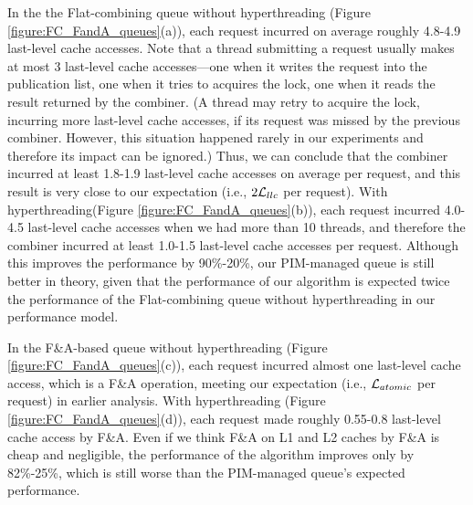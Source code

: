 In the the Flat-combining queue without hyperthreading (Figure \ref{figure:FC_FandA_queues}(a)), 
each request incurred on average roughly 4.8-4.9 last-level cache accesses. 
Note that a thread submitting a request usually makes at most 3 last-level cache accesses---one 
when it writes the request into the publication list, one when it tries to acquires the lock, 
one when it reads the result returned by the combiner. 
(A thread may retry to acquire the lock, incurring more last-level cache accesses, 
if its request was missed by the previous combiner. 
However, this situation happened rarely in our experiments and therefore its impact can be ignored.) 
Thus, we can conclude that the combiner incurred at least 1.8-1.9 last-level cache accesses 
on average per request, and this result is very close to our expectation (i.e., $2\mathcal{L}_{llc}$ per request). 
With hyperthreading(Figure \ref{figure:FC_FandA_queues}(b)), 
each request incurred 4.0-4.5 last-level cache accesses when we had more than 10 threads, 
and therefore the combiner incurred at least 1.0-1.5 last-level cache accesses per request. 
Although this improves the performance by 90\%-20\%, our PIM-managed queue is still better in theory, 
given that the performance of our algorithm is expected twice the performance of 
the Flat-combining queue without hyperthreading in our performance model. 

In the F\&A-based queue without hyperthreading (Figure \ref{figure:FC_FandA_queues}(c)), 
each request incurred almost one last-level cache access, which is a F\&A operation, 
meeting our expectation (i.e., $\mathcal{L}_{atomic}$ per request) in earlier analysis. 
With hyperthreading (Figure \ref{figure:FC_FandA_queues}(d)), each request made roughly 
0.55-0.8 last-level cache access by F\&A. 
Even if we think F\&A on L1 and L2 caches by F\&A is cheap and negligible, 
the performance of the algorithm improves only by 82\%-25\%, which is still worse than 
the PIM-managed queue's expected performance. 


